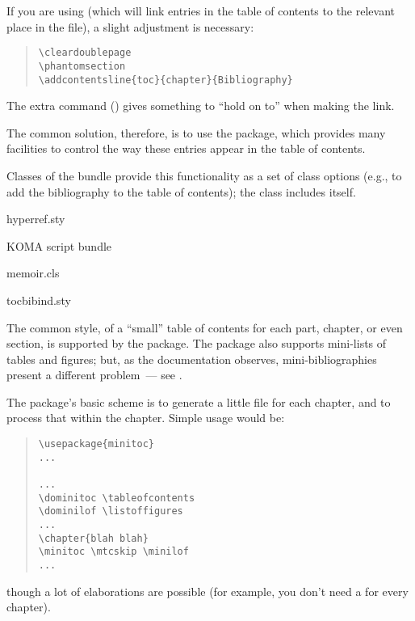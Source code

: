 If you are using  (which will link entries in the
table of contents to the relevant place in the file), a slight
adjustment is necessary:
\begin{quote}
\begin{verbatim}
\cleardoublepage
\phantomsection
\addcontentsline{toc}{chapter}{Bibliography}

\end{verbatim}
\end{quote}
The extra command () gives 
something to ``hold on to'' when making the link.

The common solution, therefore, is to use the 
package, which provides many facilities to control the way these
entries appear in the table of contents.

Classes of the  bundle provide this functionality
as a set of class options (e.g.,  to add the
bibliography to the table of contents); the  class includes
 itself.
\begin{ctanrefs}
\item[hyperref.sty]
\item[\nothtml{\rmfamily}KOMA script bundle]
\item[memoir.cls]
\item[tocbibind.sty]
\end{ctanrefs}


The common style, of a ``small'' table of contents for each part,
chapter, or even section, is supported by the 
package.  The package also supports mini-lists of tables and figures;
but, as the documentation observes, mini-bibliographies present a
different problem~--- see
.

The package's basic scheme is to generate a little  file for
each chapter, and to process that within the chapter.  Simple usage
would be:
\begin{quote}
\begin{verbatim}
\usepackage{minitoc}
...

...
\dominitoc \tableofcontents
\dominilof \listoffigures
...
\chapter{blah blah}
\minitoc \mtcskip \minilof
...
\end{verbatim}
\end{quote}
though a lot of elaborations are possible (for example, you don't need
a  for every chapter).

